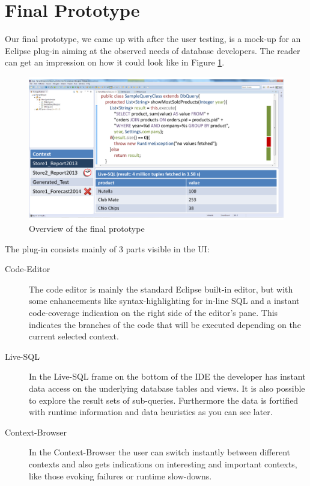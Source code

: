 
\section{Final Prototype}
\label{sec:FINAL_PROTOTYPE}
Our final prototype, we came up with after the user testing, is a mock-up for an Eclipse plug-in aiming at the observed needs of database developers. The reader can get an impression on how it could look like in Figure \ref{fig:final_prototype_overview}.
\begin{figure}
\begin{centering}
    \includegraphics[width=1.0\linewidth]{images/final_prototype}
    \caption{Overview of the final prototype}
    \label{fig:final_prototype_overview}
\end{centering}
\end{figure}
The plug-in consists mainly of 3 parts visible in the UI:
\begin{description}
	\item [Code-Editor] The code editor is mainly the standard Eclipse built-in editor, but with some enhancements like syntax-highlighting for in-line SQL and a instant code-coverage indication on the right side of the editor's pane. This indicates the branches of the code that will be executed depending on the current selected context.
	\item [Live-SQL] In the Live-SQL frame on the bottom of the IDE the developer has instant data access on the underlying database tables and views. It is also possible to explore the result sets of sub-queries. Furthermore the data is fortified with runtime information and data heuristics as you can see later.
	\item [Context-Browser] In the Context-Browser the user can switch instantly between different contexts and also gets indications on interesting and important contexts, like those evoking failures or runtime slow-downs.
\end{description}
